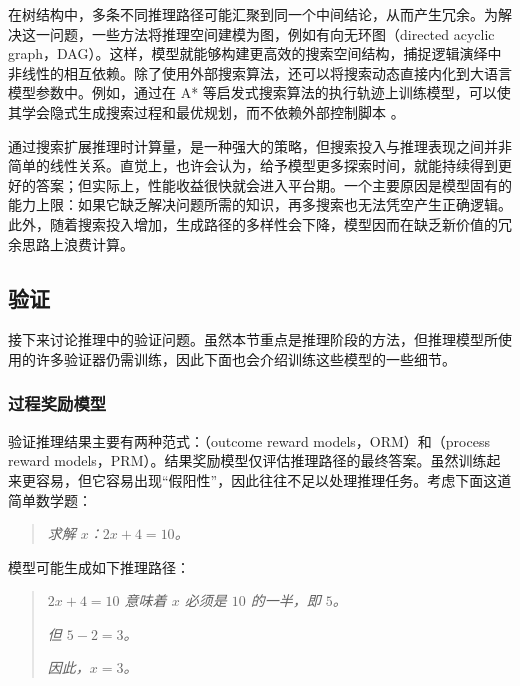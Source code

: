 在树结构中，多条不同推理路径可能汇聚到同一个中间结论，从而产生冗余。为解决这一问题，一些方法将推理空间建模为图，例如有向无环图（directed acyclic graph，DAG）\cite{zhang-etal:2025cumulative}。这样，模型就能够构建更高效的搜索空间结构，捕捉逻辑演绎中非线性的相互依赖。除了使用外部搜索算法，还可以将搜索动态直接内化到大语言模型参数中。例如，通过在 A* 等启发式搜索算法的执行轨迹上训练模型，可以使其学会隐式生成搜索过程和最优规划，而不依赖外部控制脚本 \cite{lehnert-etal:2025beyond}。

通过搜索扩展推理时计算量，是一种强大的策略，但搜索投入与推理表现之间并非简单的线性关系。直觉上，也许会认为，给予模型更多探索时间，就能持续得到更好的答案；但实际上，性能收益很快就会进入平台期。一个主要原因是模型固有的能力上限：如果它缺乏解决问题所需的知识，再多搜索也无法凭空产生正确逻辑。此外，随着搜索投入增加，生成路径的多样性会下降，模型因而在缺乏新价值的冗余思路上浪费计算。

\subsection{验证}
\label{sec:reasoning-verification}

接下来讨论推理中的验证问题。虽然本节重点是推理阶段的方法，但推理模型所使用的许多验证器仍需训练，因此下面也会介绍训练这些模型的一些细节。

\subsubsection{过程奖励模型}

验证推理结果主要有两种范式：（outcome reward models，ORM）和（process reward models，PRM）\cite{uesato-etal:2022solving,lightman-etal:2024lets}。结果奖励模型仅评估推理路径的最终答案。虽然训练起来更容易，但它容易出现“假阳性”，因此往往不足以处理推理任务。考虑下面这道简单数学题：

\vspace{0.5em}
\begin{quote}
\textit{求解 $x$：$2x + 4 = 10$。}
\end{quote}

\vspace{0.5em}
模型可能生成如下推理路径：
\vspace{0.5em}

\begin{quote}
\textit{$2x + 4 = 10$ 意味着 $x$ 必须是 $10$ 的一半，即 $5$。}

\textit{但 $5 - 2 = 3$。}

\textit{因此，$x = 3$。}
\end{quote}
\vspace{0.5em}

